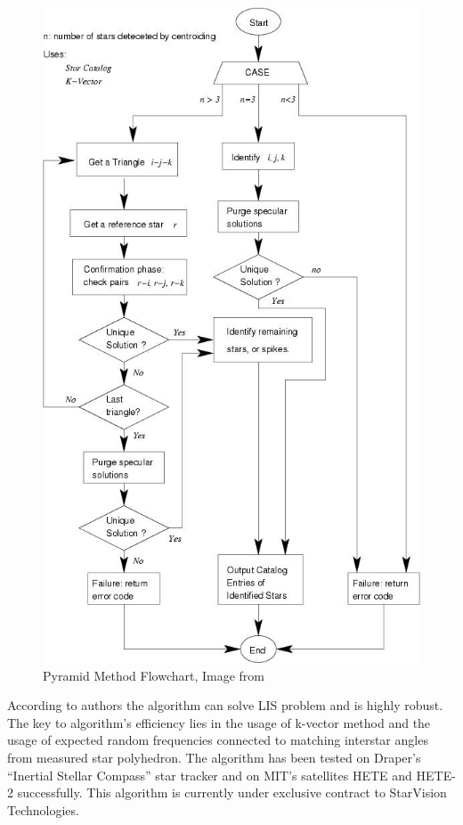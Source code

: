 \documentclass[12pt,a4paper,twoside]{article}
\begin{document}
\begin{figure}[!htbp]
\includegraphics[scale=0.57]{pyramid_method.jpg}
\centering
\caption[Pyramid Method Flowchart]{Pyramid Method Flowchart, Image from \citet{mortari2004pyramid}}
\label{fig:pyramid_method}
\end{figure}

According to authors the algorithm can solve LIS problem and is highly robust. The key to algorithm's efficiency lies in the usage of k-vector method and the usage of expected random frequencies connected to matching interstar angles from measured star polyhedron. The algorithm has been tested on Draper’s “Inertial Stellar Compass” star tracker\cite{brady2002inertial} and on MIT’s satellites HETE and HETE-2\cite{crew2002hete} successfully. This algorithm is currently under exclusive contract to StarVision Technologies\cite{jacox2006method}\cite{pyramid-starvision}.
\end{document}
